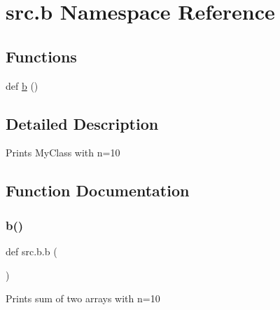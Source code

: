 \hypertarget{namespacesrc_1_1b}{}\section{src.\+b Namespace Reference}
\label{namespacesrc_1_1b}
\subsection*{Functions}
\begin{DoxyCompactItemize}
\item 
def \hyperlink{namespacesrc_1_1b_afee0552d4bea354c388fd3bfacc91440}{b} ()
\end{DoxyCompactItemize}


\subsection{Detailed Description}
\begin{DoxyVerb}Prints MyClass with n=10
\end{DoxyVerb}
 

\subsection{Function Documentation}
\mbox{\label{namespacesrc_1_1b_afee0552d4bea354c388fd3bfacc91440}} 
\subsubsection{\texorpdfstring{b()}{b()}}
{\footnotesize\ttfamily def src.\+b.\+b (\begin{DoxyParamCaption}{ }\end{DoxyParamCaption})}

\begin{DoxyVerb}Prints sum of two arrays with n=10
\end{DoxyVerb}
 